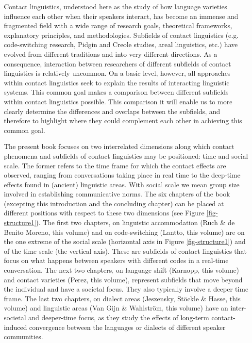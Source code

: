 \noindent Contact linguistics, understood here as the study of how language varieties influence each other when their speakers interact, has become an immense and fragmented field with a wide range of research goals, theoretical frameworks, explanatory principles, and methodologies. Subfields of contact linguistics (e.g. code-switching research, Pidgin and Creole studies, areal linguistics, etc.) have evolved from different traditions and into very different directions. As a consequence, interaction between researchers of different subfields of contact linguistics is relatively uncommon. On a basic level, however, all approaches within contact linguistics seek to explain the results of interacting linguistic systems. This common goal makes a comparison between different subfields within contact linguistics possible. This comparison it will enable us to more clearly determine the differences and overlaps between the subfields, and therefore to highlight where they could complement each other in achieving this common goal.


The present book focuses on two interrelated dimensions along which contact phenomena and subfields of contact linguistics may be positioned: time and social scale. The former refers to the time frame for which the contact effects are observed, ranging from conversations taking place in real time to the deep-time effects found in (ancient) linguistic areas. With social scale we mean group size involved in establishing communicative norms. The six chapters of the book (excepting this introduction and the concluding chapter) can be placed at different positions with respect to these two dimensions (see Figure \ref{fig-structure1}). The first two chapters, on linguistic accommodation (Ruch \& de Benito Moreno, this volume) and on code-switching (Lantto, this volume) are on the one extreme of the social scale (horizontal axis in Figure \ref{fig-structure1}) and of the time scale (the vertical axis). These are subfields of contact linguistics that focus on what happens between speakers with different codes in a real-time conversation. The next two chapters, on language shift (Karnopp, this volume) and contact varieties (Perez, this volume), represent subfields that move beyond the individual and have a societal focus. They also typically involve a deeper time frame. The last two chapters, on dialect areas (Jeszensky, Stöckle \& Hasse, this volume) and linguistic areas (Van Gijn \& Wahlström, this volume) have an inter-societal and deeper-time focus, as they study the effects of long-term contact-induced convergence between the languages or dialects of different speaker communities. 


